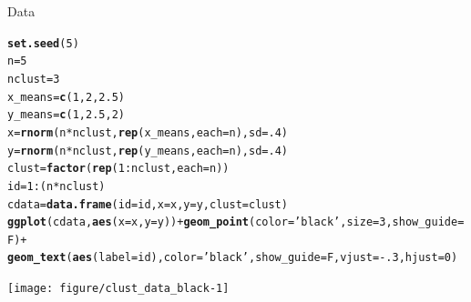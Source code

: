 \documentclass{beamer}\usepackage[]{graphicx}\usepackage[]{color}
\makeatletter
\newcommand{\hlnum}[1]{\textcolor[rgb]{0.686,0.059,0.569}{#1}}%
\newcommand{\hlstr}[1]{\textcolor[rgb]{0.192,0.494,0.8}{#1}}%
\newcommand{\hlopt}[1]{\textcolor[rgb]{0,0,0}{#1}}%
\newcommand{\hlstd}[1]{\textcolor[rgb]{0.345,0.345,0.345}{#1}}%
\newcommand{\hlkwb}[1]{\textcolor[rgb]{0.69,0.353,0.396}{#1}}%
\newcommand{\hlkwc}[1]{\textcolor[rgb]{0.333,0.667,0.333}{#1}}%
\newcommand{\hlkwd}[1]{\textcolor[rgb]{0.737,0.353,0.396}{\textbf{#1}}}%
\newenvironment{kframe}{%
 \def\at@end@of@kframe{}%
 \ifinner\ifhmode%
  \def\at@end@of@kframe{\end{minipage}}%
  \begin{minipage}{\columnwidth}%
 \fi\fi%
 \def\FrameCommand##1{\hskip\@totalleftmargin \hskip-\fboxsep
 \colorbox{shadecolor}{##1}\hskip-\fboxsep
     \hskip-\linewidth \hskip-\@totalleftmargin \hskip\columnwidth}%
 \MakeFramed {\advance\hsize-\width
   \@totalleftmargin\z@ \linewidth\hsize
   \@setminipage}}%
 {\par\unskip\endMakeFramed%
 \at@end@of@kframe}
\newenvironment{knitrout}{}{} %
\makeatother
\begin{document}
\begin{frame}[fragile]{Data}
\begin{knitrout}\tiny
{}\color{fgcolor}\begin{kframe}
\begin{alltt}
\hlkwd{set.seed}\hlstd{(}\hlnum{5}\hlstd{)}
\hlstd{n} \hlkwb{=} \hlnum{5}
\hlstd{nclust} \hlkwb{=} \hlnum{3}
\hlstd{x_means} \hlkwb{=} \hlkwd{c}\hlstd{(}\hlnum{1}\hlstd{,} \hlnum{2}\hlstd{,} \hlnum{2.5}\hlstd{)}
\hlstd{y_means} \hlkwb{=} \hlkwd{c}\hlstd{(}\hlnum{1}\hlstd{,} \hlnum{2.5}\hlstd{,} \hlnum{2}\hlstd{)}
\hlstd{x} \hlkwb{=} \hlkwd{rnorm}\hlstd{(n} \hlopt{*} \hlstd{nclust,} \hlkwd{rep}\hlstd{(x_means,} \hlkwc{each}\hlstd{=n),} \hlkwc{sd}\hlstd{=}\hlnum{.4}\hlstd{)}
\hlstd{y} \hlkwb{=} \hlkwd{rnorm}\hlstd{(n} \hlopt{*} \hlstd{nclust,} \hlkwd{rep}\hlstd{(y_means,} \hlkwc{each}\hlstd{=n),} \hlkwc{sd}\hlstd{=}\hlnum{.4}\hlstd{)}
\hlstd{clust} \hlkwb{=} \hlkwd{factor}\hlstd{(}\hlkwd{rep}\hlstd{(}\hlnum{1}\hlopt{:}\hlstd{nclust,} \hlkwc{each}\hlstd{=n))}
\hlstd{id} \hlkwb{=} \hlnum{1}\hlopt{:}\hlstd{(n} \hlopt{*} \hlstd{nclust)}
\hlstd{cdata} \hlkwb{=} \hlkwd{data.frame}\hlstd{(}\hlkwc{id}\hlstd{=id,} \hlkwc{x}\hlstd{=x,} \hlkwc{y}\hlstd{=y,} \hlkwc{clust}\hlstd{=clust)}
\hlkwd{ggplot}\hlstd{(cdata,} \hlkwd{aes}\hlstd{(}\hlkwc{x}\hlstd{=x,} \hlkwc{y}\hlstd{=y))} \hlopt{+} \hlkwd{geom_point}\hlstd{(}\hlkwc{color}\hlstd{=}\hlstr{'black'}\hlstd{,} \hlkwc{size}\hlstd{=}\hlnum{3}\hlstd{,} \hlkwc{show_guide}\hlstd{=F)} \hlopt{+}
  \hlkwd{geom_text}\hlstd{(}\hlkwd{aes}\hlstd{(}\hlkwc{label}\hlstd{=id),} \hlkwc{color}\hlstd{=}\hlstr{'black'}\hlstd{,} \hlkwc{show_guide}\hlstd{=F,} \hlkwc{vjust}\hlstd{=}\hlopt{-}\hlnum{.3}\hlstd{,} \hlkwc{hjust}\hlstd{=}\hlnum{0}\hlstd{)}
\end{alltt}
\end{kframe}

{\centering \texttt{[image: figure/clust\_data\_black-1]} 

}



\end{knitrout}
\end{frame}
\end{document}
